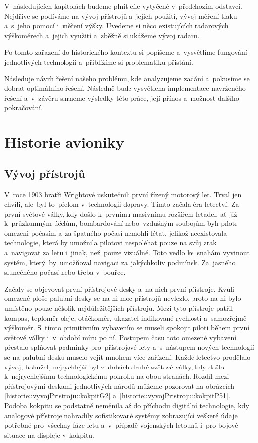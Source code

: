	V~následujících kapitolách budeme plnit cíle vytyčené v~předchozím odstavci. Nejdříve se podíváme na vývoj přístrojů a~jejich použití, vývoj měření tlaku a~s~jeho pomocí i~měření výšky. Uvedeme si něco existujících radarových výškoměrech a~jejich využití a~zběžně si ukážeme vývoj radaru.\par
	Po tomto zařazení do historického kontextu si popíšeme a~vysvětlíme fungování jednotlivých technologií a~přiblížíme si problematiku přistání.\par
	Následuje návrh řešení našeho problému, kde analyzujeme zadání a~pokusíme se dobrat optimálního řešení. Následně bude vysvětlena implementace navrženého řešení a~v~závěru shrneme výsledky této práce, její přínos a~možnost dalšího pokračování.

\chapter{Historie avioniky}
	\section{Vývoj přístrojů}
	
		V~roce 1903 bratři Wrightové uskutečnili první řízený motorový let. Trval jen chvíli, ale~byl to~přelom v~technologii dopravy. Tímto začala éra letectví. Za první světové války, kdy došlo k~prvnímu masivnímu rozšíření letadel,  ať~již k~průzkumným účelům, bombardování nebo~vzdušným soubojům byli piloti omezeni počasím a~za špatného počasí nemohli létat, jelikož neexistovala technologie, která by umožnila pilotovi nespoléhat pouze na svůj zrak a~navigovat za letu i~jinak, než~pouze vizuálně. Toto vedlo ke~snahám vyvinout systém, který~by~umožňoval navigaci za~jakýchkoliv podmínek. Za~jasného slunečného počasí nebo třeba v~bouřce.\par
		
		Začaly se objevovat první přístrojové desky a~na nich první přístroje. Kvůli omezené ploše palubní desky se na ni moc přístrojů nevlezlo, proto na ni bylo umístěno pouze několik nejdůležitějších přístrojů. Mezi tyto přístroje patřil kompas, teploměr oleje, otáčkoměr, ukazatel indikované rychlosti a~samozřejmě výškoměr. S~tímto primitivním vybavením se museli spokojit piloti během první světové války i~v~období míru po ní. Postupem času toto omezené vybavení přestalo splňovat podmínky pro~přístrojové lety a~s~nástupem nových technologií se na palubní desku muselo vejít mnohem více zařízení. Každé letectvo prodělalo vývoj, bohužel, nejrychlejší byl v~dobách druhé světové války, kdy došlo k~nejrychlejšímu technologickému pokroku na obou stranách. Rozdíl mezi přístrojovými deskami jednotlivých národů můžeme pozorovat na obrázcích \ref{historie::vyvojPristroju::kokpitG2} a~\ref{historie::vyvojPristroju::kokpitP51}.
		Podoba kokpitu se podstatně neměnila až do příchodu digitální technologie, kdy analogové přístroje nahradily sofistikované systémy zobrazující veškeré údaje potřebné pro~všechny fáze letu a~v~případě vojenských letounů i~pro bojové situace na displeje v~kokpitu. 
		
